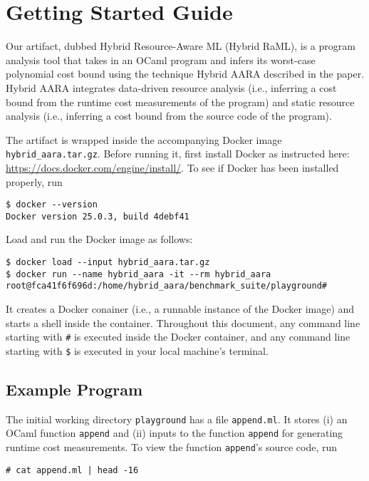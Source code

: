 
\section{Getting Started Guide}

Our artifact, dubbed Hybrid Resource-Aware ML (Hybrid RaML), is a program analysis tool
that takes in an OCaml program and infers its worst-case polynomial cost bound
using the technique Hybrid AARA described in the paper.
%
Hybrid AARA integrates data-driven resource analysis (i.e., inferring a cost
bound from the runtime cost measurements of the program) and static resource
analysis (i.e., inferring a cost bound from the source code of the program).

The artifact is wrapped inside the accompanying Docker image
\texttt{hybrid\_aara.tar.gz}.
%
Before running it, first install Docker as instructed here:
\url{https://docs.docker.com/engine/install/}.
%
To see if Docker has been installed properly, run
\begin{verbatim}
$ docker --version
Docker version 25.0.3, build 4debf41
\end{verbatim}

Load and run the Docker image as follows:
\begin{verbatim}
$ docker load --input hybrid_aara.tar.gz
$ docker run --name hybrid_aara -it --rm hybrid_aara
root@fca41f6f696d:/home/hybrid_aara/benchmark_suite/playground#
\end{verbatim}
%
It creates a Docker conainer (i.e., a runnable instance of the Docker image) and
starts a shell inside the container.
%
Throughout this document, any command line starting with \texttt{\#} is executed
inside the Docker container, and any command line starting with \texttt{\$} is
executed in your local machine's terminal.

\subsection{Example Program}

The initial working directory \texttt{playground} has a file \texttt{append.ml}.
%
It stores (i) an OCaml function \texttt{append} and (ii) inputs to the function
\texttt{append} for generating runtime cost measurements.
%
To view the function \texttt{append}'s source code, run
\begin{verbatim}
# cat append.ml | head -16
\end{verbatim}

